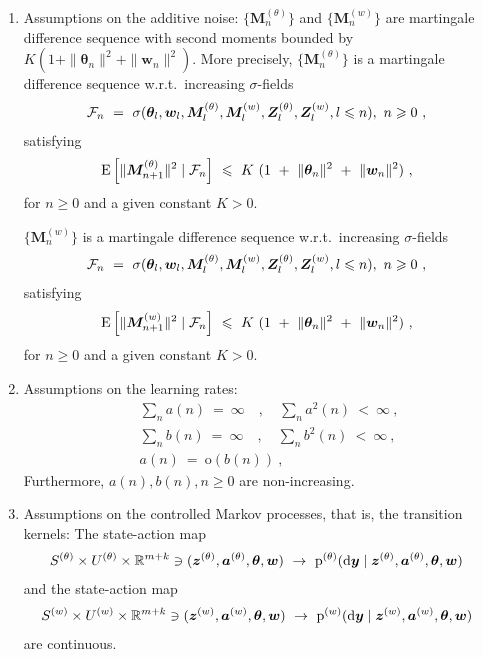 \documentclass{article}
\newcommand\Ba{\bm{a}}
\newcommand\Bw{\bm{w}}
\newcommand\By{\bm{y}}
\newcommand\Bz{\bm{z}}
\newcommand\BM{\bm{M}}
\newcommand\BZ{\bm{Z}}
\newcommand\Bth{\bm{\theta}}
\newcommand{\rE}{\mathrm{E}} \newcommand{\rF}{\mathrm{F}}
\newcommand{\Ro}{\mathrm{o}} \newcommand{\Rp}{\mathrm{p}}
\renewcommand{\leq}{\leqslant}
\renewcommand{\geq}{\geqslant}
\begin{document}
\begin{enumerate}[label=\textbf{(A\arabic*)}]
\item Assumptions on the additive noise:
$\{\BM^{(\theta)}_{n}\}$ and $\{\BM^{(w)}_{n}\}$
are martingale difference sequence with second
moments bounded by $K(1+\|\Bth_n\|^2 + \|\Bw_n\|^2)$.
More precisely,
$\{\BM^{(\theta)}_{n}\}$ is a martingale difference sequence
w.r.t.\ increasing $\sigma$-fields
\begin{align}
\cF_n \ &= \ \sigma(\Bth_l, \Bw_l, \BM^{(\theta)}_{l}, \BM^{(w)}_{l},
          \BZ^{(\theta)}_{l}, \BZ^{(w)}_{l}, l \leq n), \ n \geq 0 \ ,
\end{align}
satisfying
\begin{align}
\rE \left[\|\BM^{(\theta)}_{n+1}\|^2 \mid \cF_n \right] \ &\leq \
K \ (1 \ + \ \|\Bth_n\|^2 \ + \ \|\Bw_n\|^2) \ ,
\end{align}
for $n \geq 0$ and a given constant $K>0$.

$\{\BM^{(w)}_{n}\}$ is a martingale difference sequence
w.r.t.\ increasing $\sigma$-fields
\begin{align}
\cF_n \ &= \ \sigma(\Bth_l, \Bw_l, \BM^{(\theta)}_{l}, \BM^{(w)}_{l},
          \BZ^{(\theta)}_{l}, \BZ^{(w)}_{l}, l \leq n), \ n \geq 0 \ ,
\end{align}
satisfying
\begin{align}
\rE \left[\|\BM^{(w)}_{n+1}\|^2 \mid \cF_n \right] \ &\leq \
K \ (1 \ + \ \|\Bth_n\|^2 \ + \ \|\Bw_n\|^2) \ ,
\end{align}
for $n \geq 0$ and a given constant $K>0$.

\item
Assumptions on the learning rates:
\begin{align}
&\sum_{n} a(n) \ = \ \infty \quad , \quad
\sum_{n} a^2(n) \ < \ \infty \ , \\
&\sum_{n} b(n) \ = \ \infty \quad , \quad
\sum_{n} b^2(n) \ < \ \infty \ , \\
&a(n) \ = \ \Ro(b(n))\ ,
\end{align}
Furthermore, $a(n), b(n),
n \geq 0$ are non-increasing.

\item Assumptions on the controlled
Markov processes, that is, the transition kernels:
The state-action map
\begin{align}
S^{(\theta)} \times U^{(\theta)} \times \dR^{m+k} \ni (\Bz^{(\theta)}, \Ba^{(\theta)}, \Bth, \Bw)  \
&\to \ \Rp^{(\theta)}(\Rd\By \mid \Bz^{(\theta)}, \Ba^{(\theta)},
  \Bth, \Bw)
\end{align}
and the state-action map
\begin{align}
S^{(w)} \times U^{(w)} \times \dR^{m+k} \ni (\Bz^{(w)}, \Ba^{(w)}, \Bth, \Bw)  \
&\to \ \Rp^{(w)}(\Rd\By \mid \Bz^{(w)}, \Ba^{(w)},
  \Bth, \Bw)
\end{align}
are continuous.



\end{enumerate}
\end{document}
